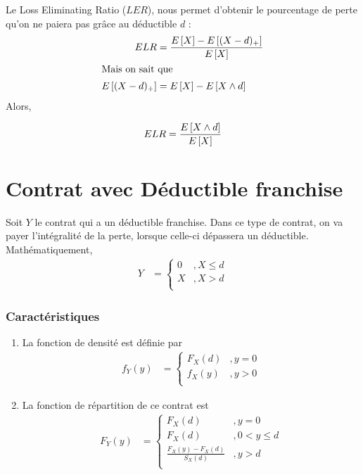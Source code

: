 \documentclass[12pt, french]{report}
\begin{document}
\begin{definition}
Le Loss Eliminating Ratio ($LER$), nous permet d'obtenir le pourcentage de perte qu'on ne paiera pas grâce au déductible $d$ : 
\begin{align*}
ELR 	& = \frac{E \left[ X \right] - E \left[ (X-d)_+ \right]}{E \left[ X \right]} \\
\shortintertext{Mais on sait que}
E \left[ (X-d)_+ \right]	& = E \left[ X \right] - E \left[ X \wedge d \right] \\
\end{align*}
Alors,

\begin{equation}
ELR  = \frac{E \left[ X \wedge d \right]}{E \left[ X \right]} 
\end{equation}
\end{definition}

\section{Contrat avec Déductible franchise}
Soit $Y$ le contrat qui a un déductible franchise. Dans ce type de contrat, on va payer l'intégralité de la perte, lorsque celle-ci dépassera un déductible. Mathématiquement,
\begin{align*}
Y	& = 
\begin{cases}
0	& , X \leq d \\
X	& , X > d \\
\end{cases}
\end{align*}

\subsubsection{Caractéristiques}
\begin{enumerate}[label=(\arabic*)]
\item La fonction de densité est définie par
\begin{align*}
f_Y(y)	& = 
\begin{cases}
F_X(d)	&, y = 0 \\
f_X(y)	&, y > 0 \\
\end{cases}
\end{align*}


\item La fonction de répartition de ce contrat est
\begin{align*}
F_Y(y)	& = 
\begin{cases}
F_X(d)	& , y = 0 \\
F_X(d)	& , 0 < y \leq d \\
\frac{F_X(y) - F_X(d)}{S_X(d)}	& , y > d \\
\end{cases}
\end{align*}
\end{enumerate}
\end{document}
